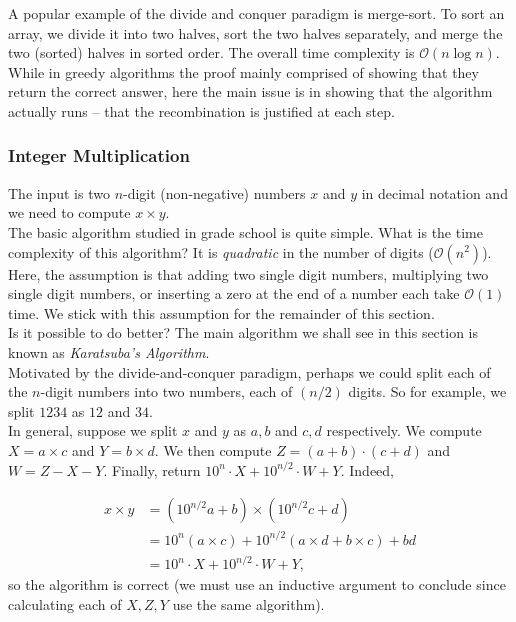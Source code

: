 A popular example of the divide and conquer paradigm is merge-sort. To sort an array, we divide it into two halves, sort the two halves separately, and merge the two (sorted) halves in sorted order. The overall time complexity is $\mathcal{O}(n\log n)$. \\

While in greedy algorithms the proof mainly comprised of showing that they return the correct answer, here the main issue is in showing that the algorithm actually runs -- that the recombination is justified at each step.

\subsubsection{Integer Multiplication}

The input is two $n$-digit (non-negative) numbers $x$ and $y$ in decimal notation and we need to compute $x\times y$.\\

The basic algorithm studied in grade school is quite simple. What is the time complexity of this algorithm? It is \textit{quadratic} in the number of digits ($\mathcal{O}(n^2)$). Here, the assumption is that adding two single digit numbers, multiplying two single digit numbers, or inserting a zero at the end of a number each take $\mathcal{O}(1)$ time. We stick with this assumption for the remainder of this section.\\

Is it possible to do better? The main algorithm we shall see in this section is known as \textit{Karatsuba's Algorithm}.\\
Motivated by the divide-and-conquer paradigm, perhaps we could split each of the $n$-digit numbers into two numbers, each of $(n/2)$ digits. So for example, we split $1234$ as $12$ and $34$.\\
In general, suppose we split $x$ and $y$ as $a,b$ and $c,d$ respectively. We compute $X=a\times c$ and $Y=b\times d$. We then compute $Z=(a+b)\cdot(c+d)$ and $W=Z-X-Y$. Finally, return $10^n\cdot X + 10^{n/2}\cdot W + Y$. Indeed,

\begin{align*}
	x\times y &= (10^{n/2}a+b)\times(10^{n/2}c+d) \\
		&= 10^n (a\times c) + 10^{n/2} (a\times d+b\times c) + bd \\
		&= 10^n\cdot X + 10^{n/2}\cdot W + Y,
\end{align*}
so the algorithm is correct (we must use an inductive argument to conclude since calculating each of $X, Z, Y$ use the same algorithm).

